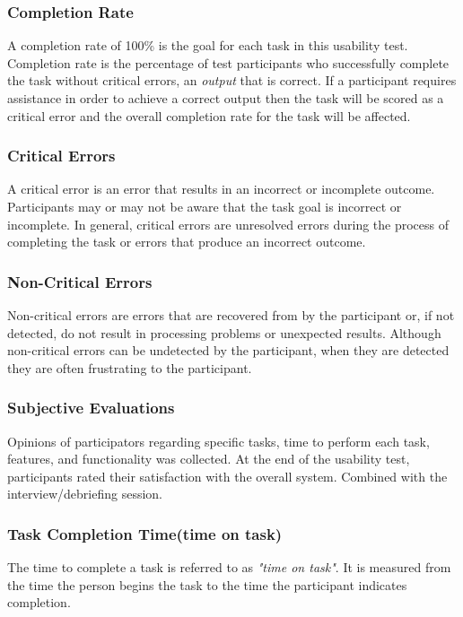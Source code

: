 \subsubsection{Completion Rate}
A completion rate of 100\% is the goal for each task in this usability test. \\
Completion rate is the percentage of test participants who successfully complete the task without critical errors, an \emph{output} that is correct. If a participant requires assistance in order to achieve a correct output then the task will be scored as a critical error and the overall completion rate for the task will be affected.

\subsubsection{Critical Errors}
A critical error is an error that results in an incorrect or incomplete outcome. Participants may or may not be aware that the task goal is incorrect or incomplete. In general, critical errors are unresolved errors during the process of completing the task or errors that produce an incorrect outcome.

\subsubsection{Non-Critical Errors}
Non-critical errors are errors that are recovered from by the participant or, if not detected, do not result in processing problems or unexpected results. Although non-critical errors can be undetected by the participant, when they are detected they are often frustrating to the participant.

\subsubsection{Subjective Evaluations}
Opinions of participators regarding specific tasks, time to perform each task, features, and functionality was collected. At the end of the usability test, participants rated their satisfaction with the overall system. Combined with the interview/debriefing session. 

\subsubsection{Task Completion Time(time on task)}
The time to complete a task is referred to as \emph{"time on task"}. It is measured from the time the person begins the task to the time the participant indicates completion.

